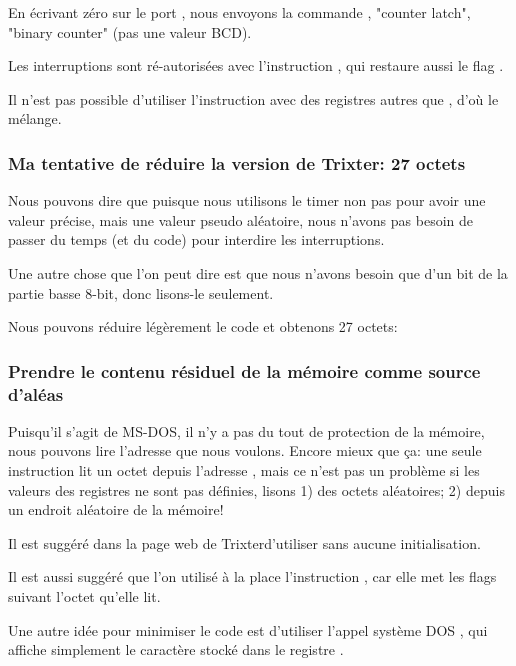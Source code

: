 En écrivant zéro sur le port ,
nous envoyons la commande ,
"counter latch", 
"binary counter" (pas une valeur \ac{BCD}).

Les interruptions sont ré-autorisées avec l'instruction , qui restaure aussi
le flag .

Il n'est pas possible d'utiliser l'instruction  avec des registres autres
que , d'où le mélange.

\subsubsection{
Ma tentative de réduire la version de Trixter: 27 octets}

Nous pouvons dire que puisque nous utilisons le timer non pas pour avoir une valeur
précise, mais une valeur pseudo aléatoire, nous n'avons pas besoin de passer du temps
(et du code) pour interdire les interruptions.

Une autre chose que l'on peut dire est que nous n'avons besoin que d'un bit de la
partie basse 8-bit, donc lisons-le seulement.

Nous pouvons réduire légèrement le code et obtenons 27 octets:



\subsubsection{
Prendre le contenu résiduel de la mémoire comme source d'aléas}

Puisqu'il s'agit de MS-DOS, il n'y a pas du tout de protection de la mémoire, nous
pouvons lire l'adresse que nous voulons.
Encore mieux que ça: une seule instruction  lit un octet depuis l'adresse
, mais ce n'est pas un problème si les valeurs des registres ne sont pas
définies, lisons 1) des octets aléatoires; 2) depuis un endroit aléatoire de la mémoire! 

Il est suggéré dans la page web de Trixter\FNURLTRIXTER d'utiliser  sans
aucune initialisation.

Il est aussi suggéré que l'on utilisé à la place l'instruction , car elle
met les flags suivant l'octet qu'elle lit.

Une autre idée pour minimiser le code est d'utiliser l'appel système DOS ,
qui affiche simplement le caractère stocké dans le registre .

